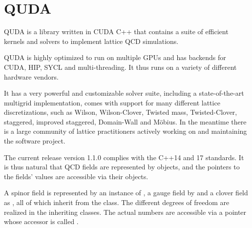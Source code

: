 \chapter{QUDA}
\label{ch:p1:quda}


QUDA \cite{QUDApaper} is a library written in CUDA C++ that contains a suite of efficient kernels and solvers to implement lattice QCD simulations.

QUDA is highly optimized to run on multiple GPUs and has backends for CUDA, HIP, SYCL and multi-threading. It thus runs on a variety of different hardware vendors.

It has a very powerful and customizable solver suite, including a state-of-the-art multigrid implementation, comes with support for many different lattice discretizations, such as Wilson, Wilson-Clover, Twisted mass, Twisted-Clover, staggered, improved staggered, Domain-Wall and Möbius. In the meantime there is a large community of lattice practitioners actively working on and maintaining the software project.

The current release version 1.1.0 complies with the C++14 and 17 standards. It is thus natural that QCD fields are represented by objects, and the pointers to the fields' values are accessible via their objects.


A spinor field is represented by an instance of , a gauge field by  and a clover field as , all of which inherit from the  class. The different degrees of freedom are realized in the inheriting classes. The actual numbers are accessible via a pointer whose accessor is called .

